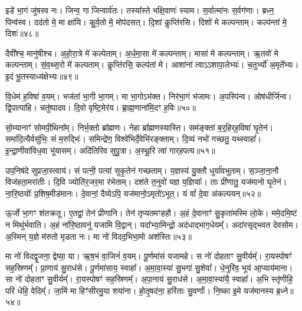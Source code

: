 इडे॑ भा॒गं जु॑षस्व नः।
जिन्व॒ गा जिन्वार्व॑तः।
तस्या᳚स्ते भक्षि॒वाणः॑ स्याम।
स॒र्वात्मा॑नः स॒र्वग॑णाः।
ब्रध्न॒ पिन्व॑स्व।
दद॑तो मे॒ मा क्षा॑यि।
कु॒र्व॒तो मे॒ मोप॑दसत्।
दि॒शां कॢप्ति॑रसि।
दिशो॑ मे कल्पन्ताम्।
कल्प॑न्तां मे॒ दिशः॑॥४८॥\ip

दैवी᳚श्च॒ मानु॑षीश्च।
अ॒हो॒रा॒त्रे मे॑ कल्पेताम्।
अ॒र्ध॒मा॒सा मे॑ कल्पन्ताम्।
मासा॑ मे कल्पन्ताम्।
ऋ॒तवो॑ मे कल्पन्ताम्।
सं॒व॒थ्स॒रो मे॑ कल्पताम्।
कॢप्ति॑रसि॒ कल्प॑तां मे।
आशा॑नां त्वा\-ऽऽशापा॒लेभ्यः॑।
च॒तुर्भ्यो॑ अ॒मृते᳚भ्यः।
इ॒दं भू॒तस्याध्य॑क्षेभ्यः॥४९॥\ip

वि॒धेम॑ ह॒विषा॑ व॒यम्।
भज॑तां भा॒गी भा॒गम्।
मा भा॒गो\-ऽभ॑क्त।
निर॑भा॒गं भ॑जामः।
अ॒पस्पि॑न्व।
ओष॑धीर्जिन्व।
द्वि॒पात्पा॑हि।
चतु॑ष्पादव।
दि॒वो वृष्टि॒मेर॑य।
ब्रा॒ह्म॒णाना॑मि॒दꣳ ह॒विः॥५०॥\ip

सो॒म्यानाꣳ॑ सोमपी॒थिना᳚म्।
निर्भ॒क्तो ब्रा᳚ह्मणः।
नेहा ब्रा᳚ह्मणस्यास्ति।
सम॑ङ्क्तां ब॒र्॒हिर्‌\mbox{}ह॒विषा॑ घृ॒तेन॑।
समा॑दि॒त्यैर्वसु॑भिः॒ सं म॒रुद्भिः॑।
समिन्द्रे॑ण॒ विश्वे॑भिर्दे॒वेभि॑रङ्क्ताम्।
दि॒व्यं नभो॑ गच्छतु॒ यथ्स्वाहा᳚।
इ॒न्द्रा॒णीवा॑विध॒वा भू॑यासम्।
अदि॑तिरिव सुपु॒त्रा।
अ॒स्थू॒रि त्वा॑ गार्‌\mbox{}हपत्य॥५१॥\ip

उप॒निष॑दे सुप्रजा॒स्त्वाय॑।
सं पत्नी॒ पत्या॑ सुकृ॒तेन॑ गच्छताम्।
य॒ज्ञस्य॑ यु॒क्तौ धुर्या॑वभूताम्।
स॒ञ्जा॒ना॒नौ विज॑हता॒मरा॑तीः।
दि॒वि ज्योति॑र॒जर॒मा र॑भेताम्।
दश॑ते त॒नुवो॑ यज्ञ य॒ज्ञियाः᳚।
ताः प्री॑णातु॒ यज॑मानो घृ॒तेन॑।
ना॒रि॒ष्ठयोः᳚ प्र॒शिष॒मीड॑मानः।
दे॒वानां॒ दैव्येऽपि॒ यज॑मानो॒\-ऽमृतो॑\-ऽभूत्।
यं वां᳚ दे॒वा अ॑कल्पयन्॥५२॥\ip

ऊ॒र्जो भा॒गꣳ श॑तक्रतू।
ए॒तद्वां॒ तेन॑ प्रीणानि।
तेन॑ तृप्यतमꣳहहौ।
अ॒हं दे॒वानाꣳ॑ सु॒कृता॑मस्मि लो॒के।
ममे॒दमि॒ष्टं न मिथु॑र्भवाति।
अ॒हं ना॑रि॒ष्ठावनु॑ यजामि वि॒द्वान्।
यदा᳚भ्या॒मिन्द्रो॒ अद॑धाद्भाग॒धेयम्᳚।
अदा॑रसृद्भवत देवसोम।
अ॒स्मिन् य॒ज्ञे म॑रुतो मृडता नः।
मा नो॑ विदद॒भिभा॒मो अश॑स्तिः॥५३॥\ip

मा नो॑ विदद्वृ॒जना॒ द्वेष्या॒ या।
ऋ॒ष॒भं वा॒जिनं॑ व॒यम्।
पू॒र्णमा॑सं यजामहे।
स नो॑ दोहताꣳ सु॒वीर्यम्᳚।
रा॒यस्पोषꣳ॑ सह॒स्रिणम्᳚।
प्रा॒णाय॑ सु॒राध॑से।
पू॒र्णमा॑साय॒ स्वाहा᳚।
अ॒मा॒वा॒स्या॑ सु॒भगा॑ सु॒शेवा᳚।
धे॒नुरि॑व॒ भूय॑ आ॒प्याय॑माना।
सा नो॑ दोहताꣳ सु॒वीर्यम्᳚।
रा॒यस्पोषꣳ॑ सह॒स्रिणम्᳚।
अ॒पा॒नाय॑ सु॒राध॑से।
अ॒मा॒वा॒स्या॑यै॒ स्वाहा᳚।
अ॒भि स्तृ॑णीहि॒ परि॑ धेहि॒ वेदिम्᳚।
जा॒मिं मा हिꣳ॑सीरमु॒या शया॑ना।
हो॒तृ॒षद॑ना॒ हरि॑ताः सु॒वर्णाः᳚।
नि॒ष्का इ॒मे यज॑मानस्य ब्र॒ध्ने॥५४॥\ip{}

